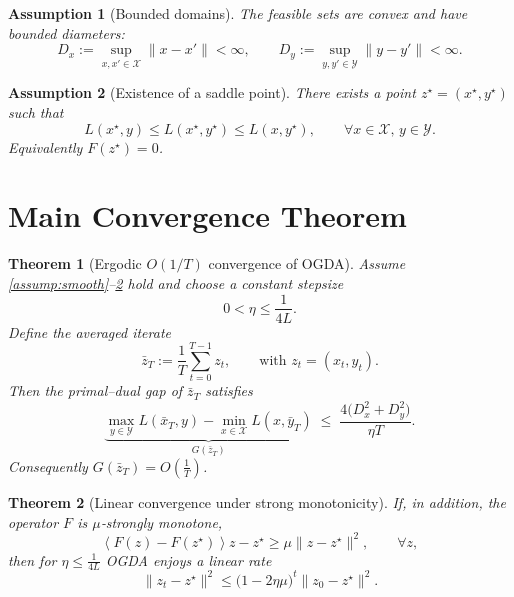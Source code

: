 \documentclass[11pt]{article}
\newtheorem{theorem}{Theorem}
\newtheorem{assumption}{Assumption}
\newcommand{\inner}[1]{\left\langle#1\right\rangle}
\begin{document}
\begin{assumption}[Bounded domains]\label{assump:bounded}
The feasible sets are convex and have bounded diameters:
\[
D_x:=\sup_{x,x'\in\mathcal X}\|x-x'\|<\infty,\qquad 
D_y:=\sup_{y,y'\in\mathcal Y}\|y-y'\|<\infty.
\tag{A2}
\]
\end{assumption}

\begin{assumption}[Existence of a saddle point]\label{assump:saddle}
There exists a point $z^\star=(x^\star,y^\star)$ such that
\[
L(x^\star,y)\le L(x^\star,y^\star)\le L(x,y^\star),\qquad\forall x\in\mathcal X,\,y\in\mathcal Y.
\tag{A3}
\]
Equivalently $F(z^\star)=0$.
\end{assumption}

\section*{Main Convergence Theorem}
\begin{theorem}[Ergodic $O(1/T)$ convergence of OGDA]\label{thm:ogda}
Assume \ref{assump:smooth}--\ref{assump:saddle} hold and choose a constant stepsize
\[
0<\eta\le\frac{1}{4L}.
\]
Define the averaged iterate
\[
\bar z_T:=\frac{1}{T}\sum_{t=0}^{T-1}z_t,\qquad 
\text{with }z_t=(x_t,y_t).
\]
Then the primal–dual gap of $\bar z_T$ satisfies
\[
\underbrace{\max_{y\in\mathcal Y}L(\bar x_T,y)-\min_{x\in\mathcal X}L(x,\bar y_T)}_{\displaystyle G(\bar z_T)}
\;\le\;
\frac{4\bigl(D_x^2+D_y^2\bigr)}{\eta T}.
\tag{T1}
\]
Consequently $G(\bar z_T)=O\!\left(\frac{1}{T}\right)$.
\end{theorem}

\begin{theorem}[Linear convergence under strong monotonicity]\label{thm:linear}
If, in addition, the operator $F$ is $\mu$‑strongly monotone,
\[
\inner{F(z)-F(z^\star)}{z-z^\star}\ge\mu\|z-z^\star\|^2,\qquad\forall z,
\]
then for $\eta\le\frac{1}{4L}$ OGDA enjoys a linear rate
\[
\|z_t-z^\star\|^2\le\bigl(1-2\eta\mu\bigr)^t\|z_0-z^\star\|^2.
\tag{T2}
\]
\end{theorem}

\end{document}
